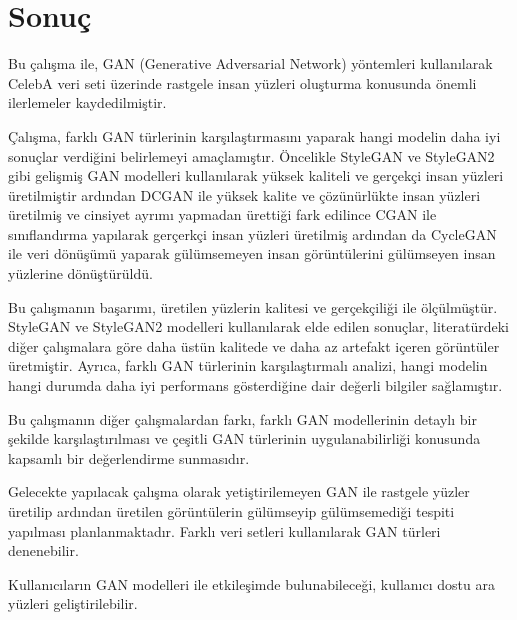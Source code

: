 \documentclass[12pt, a4paper]{article}
\begin{document}
	\section{Sonuç}
	Bu çalışma ile, GAN (Generative Adversarial Network) yöntemleri kullanılarak CelebA veri seti üzerinde rastgele insan yüzleri oluşturma konusunda önemli ilerlemeler kaydedilmiştir. 
	
	Çalışma, farklı GAN türlerinin karşılaştırmasını yaparak hangi modelin daha iyi sonuçlar verdiğini belirlemeyi amaçlamıştır. Öncelikle StyleGAN ve StyleGAN2 gibi gelişmiş GAN modelleri kullanılarak yüksek kaliteli ve gerçekçi insan yüzleri üretilmiştir ardından DCGAN ile yüksek kalite ve çözünürlükte insan yüzleri üretilmiş ve cinsiyet ayrımı yapmadan ürettiği fark edilince CGAN ile sınıflandırma yapılarak gerçerkçi insan yüzleri üretilmiş ardından da CycleGAN ile veri dönüşümü yaparak gülümsemeyen insan görüntülerini gülümseyen insan yüzlerine dönüştürüldü.
	
	Bu çalışmanın başarımı, üretilen yüzlerin kalitesi ve gerçekçiliği ile ölçülmüştür. StyleGAN ve StyleGAN2 modelleri kullanılarak elde edilen sonuçlar, literatürdeki diğer çalışmalara göre daha üstün kalitede ve daha az artefakt içeren görüntüler üretmiştir. Ayrıca, farklı GAN türlerinin karşılaştırmalı analizi, hangi modelin hangi durumda daha iyi performans gösterdiğine dair değerli bilgiler sağlamıştır. 
	
	Bu çalışmanın diğer çalışmalardan farkı, farklı GAN modellerinin detaylı bir şekilde karşılaştırılması ve çeşitli GAN türlerinin uygulanabilirliği konusunda kapsamlı bir değerlendirme sunmasıdır.
	
	Gelecekte yapılacak çalışma olarak yetiştirilemeyen GAN ile rastgele yüzler üretilip ardından üretilen görüntülerin gülümseyip gülümsemediği tespiti yapılması planlanmaktadır. Farklı veri setleri kullanılarak GAN türleri denenebilir.
	
	Kullanıcıların GAN modelleri ile etkileşimde bulunabileceği, kullanıcı dostu ara yüzleri geliştirilebilir.
	
	\clearpage
	\begin{center}
		
		
	\end{center}	
\end{document}
